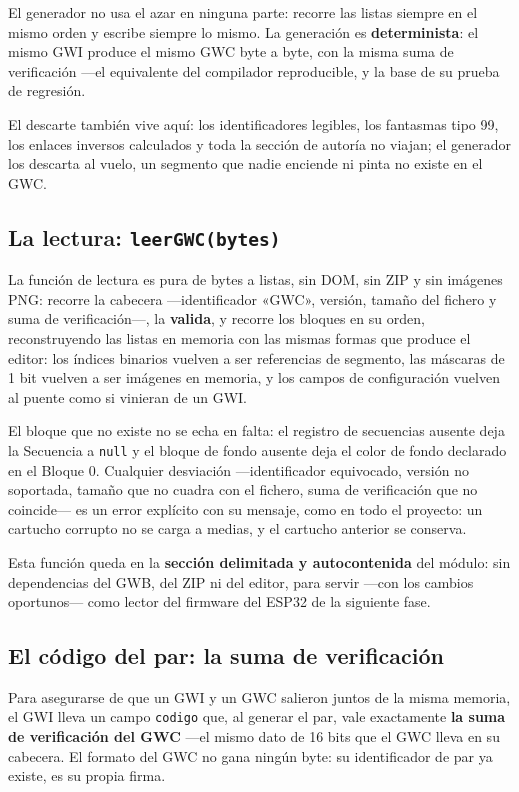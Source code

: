 El generador no usa el azar en ninguna parte: recorre las listas
siempre en el mismo orden y escribe siempre lo mismo. La generación
es \textbf{determinista}: el mismo GWI produce el mismo GWC byte a
byte, con la misma suma de verificación —el equivalente del
compilador reproducible, y la base de su prueba de regresión.

El descarte también vive aquí: los identificadores legibles, los
fantasmas tipo 99, los enlaces inversos calculados y toda la
sección de autoría no viajan; el generador los descarta al vuelo,
un segmento que nadie enciende ni pinta no existe en el GWC.

\subsection{La lectura: \texttt{leerGWC(bytes)}}\label{sec:F5I6Lectura}

La función de lectura es pura de bytes a listas, sin DOM, sin ZIP y
sin imágenes PNG: recorre la cabecera —identificador «GWC»,
versión, tamaño del fichero y suma de verificación—, la
\textbf{valida}, y recorre los bloques en su orden, reconstruyendo
las listas en memoria con las mismas formas que produce el editor:
los índices binarios vuelven a ser referencias de segmento, las
máscaras de 1 bit vuelven a ser imágenes en memoria, y los campos
de configuración vuelven al puente como si vinieran de un GWI.

El bloque que no existe no se echa en falta: el registro de
secuencias ausente deja la Secuencia a \texttt{null} y el bloque de
fondo ausente deja el color de fondo declarado en el Bloque 0.
Cualquier desviación —identificador equivocado, versión no
soportada, tamaño que no cuadra con el fichero, suma de
verificación que no coincide— es un error explícito con su
mensaje, como en todo el proyecto: un cartucho corrupto no se
carga a medias, y el cartucho anterior se conserva.

Esta función queda en la \textbf{sección delimitada y
	autocontenida} del módulo: sin dependencias del GWB, del ZIP ni del
editor, para servir —con los cambios oportunos— como lector del
firmware del ESP32 de la siguiente fase.

\subsection{El código del par: la suma de verificación}\label{sec:F5I6Codigo}

Para asegurarse de que un GWI y un GWC salieron juntos de la misma
memoria, el GWI lleva un campo \texttt{codigo} que, al generar el
par, vale exactamente \textbf{la suma de verificación del GWC}
—el mismo dato de 16 bits que el GWC lleva en su cabecera. El
formato del GWC no gana ningún byte: su identificador de par ya
existe, es su propia firma.

